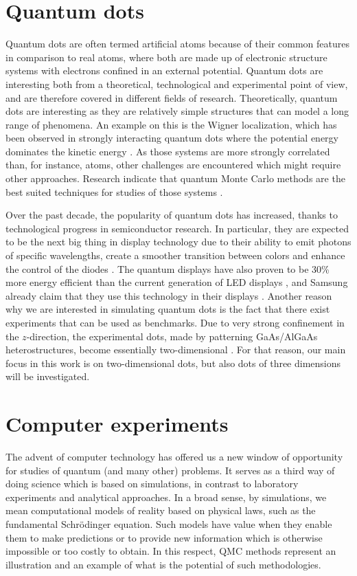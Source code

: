 \section{Quantum dots}
Quantum dots are often termed artificial atoms because of their common features in comparison to real atoms, where both are made up of electronic structure systems with electrons confined in an external potential. Quantum dots are interesting both from a theoretical, technological and experimental point of view, and are therefore covered in different fields of research. Theoretically, quantum dots are interesting as they are relatively simple structures that can model a long range of phenomena. An example on this is the Wigner localization, which has been observed in strongly interacting quantum dots where the potential energy dominates the kinetic energy \cite{ghosal_incipient_2007, hogberget_quantum_2013}. As those systems are more strongly correlated than, for instance, atoms, other challenges are encountered which might require other approaches. Research indicate that quantum Monte Carlo methods are the best suited techniques for studies of those systems \cite{ghosal_incipient_2007}.

Over the past decade, the popularity of quantum dots has increased, thanks to technological progress in semiconductor research. In particular, they are expected to be the next big thing in display technology due to their ability to emit photons of specific wavelengths, create a smoother transition between colors and enhance the control of the diodes \cite{noauthor_samsung_nodate}. The quantum displays have also proven to be 30\% more energy efficient than the current generation of LED displays \cite{manders_8.3:_2015}, and Samsung already claim that they use this technology in their displays \cite{noauthor_samsung_nodate}. Another reason why we are interested in simulating quantum dots is the fact that there exist experiments that can be used as benchmarks. Due to very strong confinement in the $z$-direction, the experimental dots, made by patterning GaAs/AlGaAs heterostructures, become essentially two-dimensional \cite{marzin_photoluminescence_1994,brunner_sharp-line_1994}. For that reason, our main focus in this work is on two-dimensional dots, but also dots of three dimensions will be investigated.

\section{Computer experiments}
The advent of computer technology has offered us a new window of opportunity for studies of quantum (and many other) problems. It serves as a third way of doing science which is based on simulations, in contrast to laboratory experiments and analytical approaches. In a broad sense, by simulations, we mean computational models of reality based on physical laws, such as the fundamental Schrödinger equation. Such models have value when they enable them to make predictions or to provide new information which is otherwise impossible or too costly to obtain. In this respect, QMC methods represent an illustration and an example of what is the potential of such methodologies.

